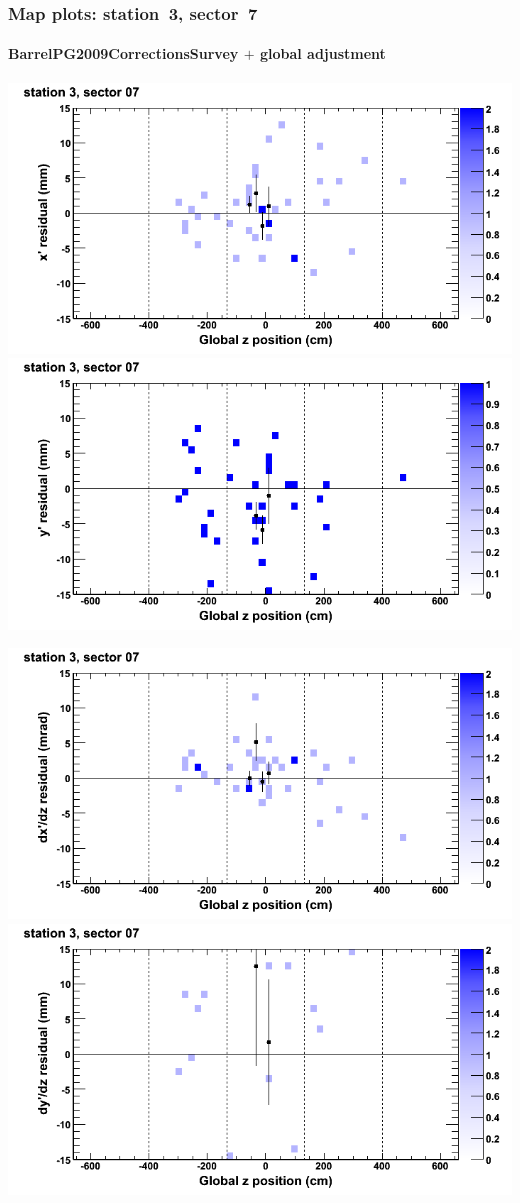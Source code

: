 \documentclass[compress]{beamer}
\begin{document}
\begin{frame}
\frametitle{Map plots: station~3, sector~7}
\framesubtitle{BarrelPG2009CorrectionsSurvey $+$ global adjustment}
\includegraphics[width=0.5\linewidth]{mapplots_re01/DTvsz_st3sec07_x.png}
\includegraphics[width=0.5\linewidth]{mapplots_re01/DTvsz_st3sec07_y.png}

\includegraphics[width=0.5\linewidth]{mapplots_re01/DTvsz_st3sec07_dxdz.png}
\includegraphics[width=0.5\linewidth]{mapplots_re01/DTvsz_st3sec07_dydz.png}
\end{frame}
\end{document}
